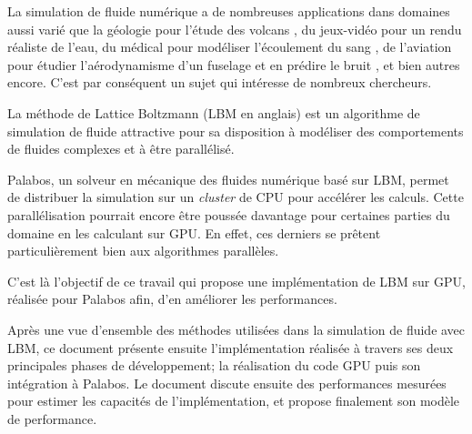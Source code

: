 La simulation de fluide numérique a de nombreuses applications dans domaines aussi varié que la géologie pour l'étude des volcans \cite{brogi_lattice_2017}, du jeux-vidéo pour un rendu réaliste de l'eau, du médical pour modéliser l'écoulement du sang \cite{hirabayashi_lattice_2004}, de l'aviation pour étudier l'aérodynamisme d'un fuselage et en prédire le bruit \cite{lew_noise_2010}, et bien autres encore. C'est par conséquent un sujet qui intéresse de nombreux chercheurs.

La méthode de Lattice Boltzmann (\acf{LBM} en anglais) est un algorithme de simulation de fluide attractive pour sa disposition à modéliser des comportements de fluides complexes et à être parallélisé.

Palabos, un solveur en mécanique des fluides numérique basé sur \acs{LBM}, permet de distribuer la simulation sur un \textit{cluster} de \acs{CPU} pour accélérer les calculs. Cette parallélisation pourrait encore être poussée  davantage pour certaines parties du domaine en les calculant sur \acs{GPU}. En effet, ces derniers se prêtent particulièrement bien aux algorithmes parallèles.

C'est là l'objectif de ce travail qui propose une implémentation de \acs{LBM} sur \acs{GPU}, réalisée pour Palabos afin, d'en améliorer les performances.

Après une vue d'ensemble des méthodes utilisées dans la simulation de fluide avec \acs{LBM}, ce document présente ensuite l'implémentation réalisée à travers ses deux principales phases de développement; la réalisation du code \acs{GPU} puis son intégration à Palabos.
Le document discute ensuite des performances mesurées pour estimer les capacités de l'implémentation, et propose finalement son modèle de performance.
